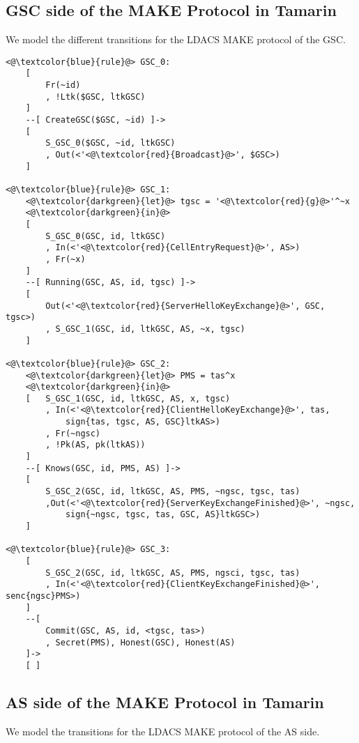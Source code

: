 \subsection{GSC side of the MAKE Protocol in Tamarin}

We model the different transitions for the LDACS MAKE protocol of the GSC.

\begin{lstlisting}
<@\textcolor{blue}{rule}@> GSC_0:
    [ 
        Fr(~id)
        , !Ltk($GSC, ltkGSC)
    ]
    --[ CreateGSC($GSC, ~id) ]->
    [ 
        S_GSC_0($GSC, ~id, ltkGSC)
        , Out(<'<@\textcolor{red}{Broadcast}@>', $GSC>)
    ]

<@\textcolor{blue}{rule}@> GSC_1:
    <@\textcolor{darkgreen}{let}@> tgsc = '<@\textcolor{red}{g}@>'^~x 
    <@\textcolor{darkgreen}{in}@> 
    [
        S_GSC_0(GSC, id, ltkGSC)
        , In(<'<@\textcolor{red}{CellEntryRequest}@>', AS>)
        , Fr(~x)
    ]
    --[ Running(GSC, AS, id, tgsc) ]->
    [
        Out(<'<@\textcolor{red}{ServerHelloKeyExchange}@>', GSC, tgsc>) 
        , S_GSC_1(GSC, id, ltkGSC, AS, ~x, tgsc)
    ]

<@\textcolor{blue}{rule}@> GSC_2:
    <@\textcolor{darkgreen}{let}@> PMS = tas^x
    <@\textcolor{darkgreen}{in}@> 
    [   S_GSC_1(GSC, id, ltkGSC, AS, x, tgsc)
        , In(<'<@\textcolor{red}{ClientHelloKeyExchange}@>', tas, 
            sign{tas, tgsc, AS, GSC}ltkAS>)
        , Fr(~ngsc)
        , !Pk(AS, pk(ltkAS)) 
    ]     
    --[ Knows(GSC, id, PMS, AS) ]->
    [ 
        S_GSC_2(GSC, id, ltkGSC, AS, PMS, ~ngsc, tgsc, tas)
        ,Out(<'<@\textcolor{red}{ServerKeyExchangeFinished}@>', ~ngsc, 
            sign{~ngsc, tgsc, tas, GSC, AS}ltkGSC>)
    ]

<@\textcolor{blue}{rule}@> GSC_3:
    [
        S_GSC_2(GSC, id, ltkGSC, AS, PMS, ngsci, tgsc, tas)
        , In(<'<@\textcolor{red}{ClientKeyExchangeFinished}@>', senc{ngsc}PMS>) 
    ]
    --[ 
        Commit(GSC, AS, id, <tgsc, tas>)
        , Secret(PMS), Honest(GSC), Honest(AS) 
    ]->
    [ ]

\end{lstlisting}

\subsection{AS side of the MAKE Protocol in Tamarin}

We model the transitions for the LDACS MAKE protocol of the AS side.


